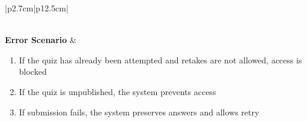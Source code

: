 \begin{table}[H]
\begin{tabular}{|p{2.7cm}|p{12.5cm}|}
\begin{minipage}[t]{\linewidth}
\begin{enumerate}[topsep=0pt,itemsep=1pt,parsep=0pt,partopsep=0pt]
                                          \end{enumerate}
                                      \end{minipage}             \\
            \hline
            \textbf{Error Scenario} & \begin{minipage}[t]{\linewidth}
                                          \begin{enumerate}[topsep=0pt,itemsep=1pt,parsep=0pt,partopsep=0pt]
                                              \item If the quiz has already been attempted and retakes are not allowed, access is
                                                    blocked
                                              \item If the quiz is unpublished, the system prevents access
                                              \item If submission fails, the system preserves answers and allows retry
                                          \end{enumerate}
                                      \end{minipage} \\
            \hline
        \end{tabular}
        \label{tab:eng-take-quiz}
    \end{table}
